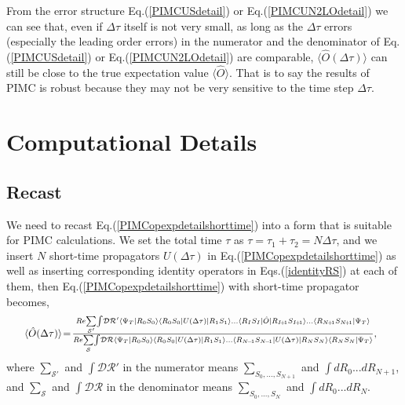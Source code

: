 \documentclass[12pt,letterpaper,UTF8]{report}
\begin{document}
From the error structure Eq.(\ref{PIMCUSdetail}) or Eq.(\ref{PIMCUN2LOdetail}) we can see that, even if $\Delta \tau$ itself is not very small, as long as the $\Delta \tau$ errors (especially the leading order errors) in the numerator and the denominator of Eq.(\ref{PIMCUSdetail}) or Eq.(\ref{PIMCUN2LOdetail}) are comparable, $\langle \hat{O} (\Delta \tau) \rangle$ can still be close to the true expectation value $\langle \hat{O} \rangle$. That is to say the results of PIMC is robust because they may not be very sensitive to the time step $\Delta \tau$.




\section{Computational Details}
\label{comdetails}

\subsection{Recast}
\label{Recast}


We need to recast Eq.(\ref{PIMCopexpdetailshorttime}) into a form that is suitable for PIMC calculations.
We set the total time $\tau$ as $\tau=\tau_1+\tau_2=N \Delta \tau$, and we insert $N$ short-time propagators $U(\Delta \tau)$ in Eq.(\ref{PIMCopexpdetailshorttime}) as well as inserting corresponding identity operators in Eqs.(\ref{identityRS}) at each of them, then Eq.(\ref{PIMCopexpdetailshorttime}) with short-time propagator becomes,
\begin{eqnarray}
\resizebox{.95\hsize}{!}{
$
\!\! \langle  \hat{O} (\Delta \tau) \rangle  \!=\!
\frac{ Re \! \sum\limits_{\mathcal{S}'} \! \int \! \mathcal{D} \mathcal{R}'   \langle \Psi_T| R_0 S_0\rangle
\langle R_0 S_0 |U(\Delta \tau) | R_1 S_1 \rangle...\langle R_I S_I |\hat{O} | R_{I\!+\!1} S_{I\!+\!1} \rangle ...
\langle R_{N\!+\!1} S_{N\!+\!1}  | \Psi_T \rangle  }
{ Re \! \sum\limits_{\mathcal{S}} \! \int \! \mathcal{D} \mathcal{R}  \langle \Psi_T| R_0 S_0\rangle
\langle R_0 S_0 | U(\Delta \tau) | R_1 S_1 \rangle ... \langle R_{N\!-\!1} S_{N\!-\!1} | U(\Delta \tau) | R_N S_N \rangle
\langle R_{N} S_{N}  | \Psi_T \rangle }, ~~
$}
\label{Oraw}
\end{eqnarray}
where $\sum\limits_{\mathcal{S}'}$ and $\int \mathcal{D} \mathcal{R}' $ in the numerator means $\sum\limits_{S_0,...,S_{N+1}}$ and $\int d R_0 ... dR_{N+1} $, and $\sum\limits_{\mathcal{S}}$ and $\int \mathcal{D} \mathcal{R}$ in the denominator means $\sum\limits_{S_0,...,S_{N}}$  and  $\int d R_0 ... dR_{N} $.
\end{document}
